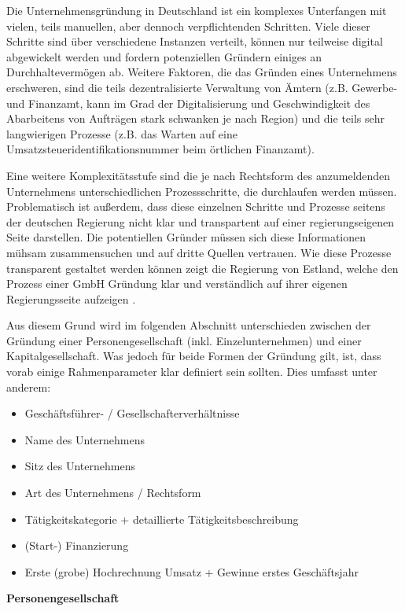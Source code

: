 Die Unternehmensgründung in Deutschland ist ein komplexes Unterfangen mit vielen, teils manuellen, aber dennoch verpflichtenden Schritten. Viele dieser Schritte sind über verschiedene Instanzen verteilt, können nur teilweise digital abgewickelt werden und fordern potenziellen Gründern einiges an Durchhaltevermögen ab. Weitere Faktoren, die das Gründen eines Unternehmens erschweren, sind die teils dezentralisierte Verwaltung von Ämtern (z.B. Gewerbe- und Finanzamt, kann im Grad der Digitalisierung und Geschwindigkeit des Abarbeitens von Aufträgen stark schwanken je nach Region) und die teils sehr langwierigen Prozesse (z.B. das Warten auf eine Umsatzsteueridentifikationsnummer beim örtlichen Finanzamt). 

Eine weitere Komplexitätsstufe sind die je nach Rechtsform des anzumeldenden Unternehmens unterschiedlichen Prozessschritte, die durchlaufen werden müssen. Problematisch ist außerdem, dass diese einzelnen Schritte und Prozesse seitens der deutschen Regierung nicht klar und transpartent auf einer regierungseigenen Seite darstellen. Die potentiellen Gründer müssen sich diese Informationen mühsam zusammensuchen und auf dritte Quellen vertrauen. Wie diese Prozesse transparent gestaltet werden können zeigt die Regierung von Estland, welche den Prozess einer GmbH Gründung klar und verständlich auf ihrer eigenen Regierungsseite aufzeigen .  

Aus diesem Grund wird im folgenden Abschnitt unterschieden zwischen der Gründung einer Personengesellschaft (inkl. Einzelunternehmen) und einer Kapitalgesellschaft. Was jedoch für beide Formen der Gründung gilt, ist, dass vorab einige Rahmenparameter klar definiert sein sollten. Dies umfasst unter anderem: 

\begin{itemize}
    \item Geschäftsführer- / Gesellschafterverhältnisse
    \item Name des Unternehmens
    \item Sitz des Unternehmens
    \item Art des Unternehmens / Rechtsform
    \item Tätigkeitskategorie + detaillierte Tätigkeitsbeschreibung
    \item (Start-) Finanzierung
    \item Erste (grobe) Hochrechnung Umsatz + Gewinne erstes Geschäftsjahr
\end{itemize} 

\textbf{Personengesellschaft}

